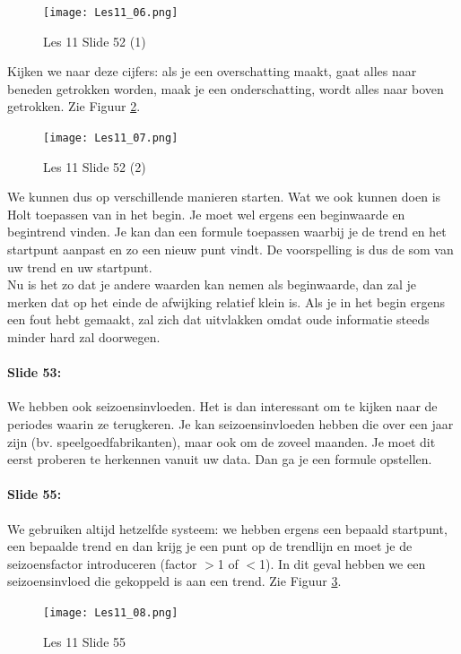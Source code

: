 \documentclass[10pt,a4paper]{report}
\begin{document}
\begin{figure}[h!]
\centering
\texttt{[image: Les11\_06.png]}
\caption{Les 11 Slide 52 (1)} 
\label{les11_06}
\end{figure}

Kijken we naar deze cijfers: als je een overschatting maakt, gaat alles naar beneden getrokken worden, maak je een onderschatting, wordt alles naar boven getrokken. Zie Figuur \ref{les11_07}.\\

\begin{figure}[h!]
\centering
\texttt{[image: Les11\_07.png]}
\caption{Les 11 Slide 52 (2)} 
\label{les11_07}
\end{figure}

We kunnen dus op verschillende manieren starten. Wat we ook kunnen doen is Holt toepassen van in het begin. Je moet wel ergens een beginwaarde en begintrend vinden. Je kan dan een formule toepassen waarbij je de trend en het startpunt aanpast en zo een nieuw punt vindt. De voorspelling is dus de som van uw trend en uw startpunt.\\
Nu is het zo dat je andere waarden kan nemen als beginwaarde, dan zal je merken dat op het einde de afwijking relatief klein is. Als je in het begin ergens een fout hebt gemaakt, zal zich dat uitvlakken omdat oude informatie steeds minder hard zal doorwegen. 

\paragraph{Slide 53:} We hebben ook seizoensinvloeden. Het is dan interessant om te kijken naar de periodes waarin ze terugkeren. Je kan seizoensinvloeden hebben die over een jaar zijn (bv. speelgoedfabrikanten), maar ook om de zoveel maanden. Je moet dit eerst proberen te herkennen vanuit uw data. Dan ga je een formule opstellen.

\paragraph{Slide 55:} We gebruiken altijd hetzelfde systeem: we hebben ergens een bepaald startpunt, een bepaalde trend en dan krijg je een punt op de trendlijn en moet je de seizoensfactor introduceren (factor $>$1 of $<$1). In dit geval hebben we een seizoensinvloed die gekoppeld is aan een trend. Zie Figuur \ref{les11_08}.

\begin{figure}[h!]
\centering
\texttt{[image: Les11\_08.png]}
\caption{Les 11 Slide 55} 
\label{les11_08}
\end{figure}
\end{document}
